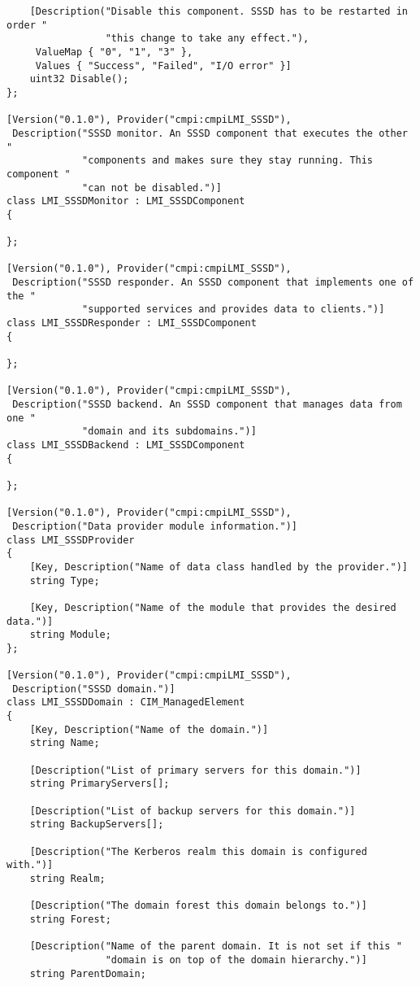 \begin{lstlisting}
    [Description("Disable this component. SSSD has to be restarted in order "
                 "this change to take any effect."),
     ValueMap { "0", "1", "3" },
     Values { "Success", "Failed", "I/O error" }]
    uint32 Disable();
};

[Version("0.1.0"), Provider("cmpi:cmpiLMI_SSSD"),
 Description("SSSD monitor. An SSSD component that executes the other "
             "components and makes sure they stay running. This component "
             "can not be disabled.")]
class LMI_SSSDMonitor : LMI_SSSDComponent
{

};

[Version("0.1.0"), Provider("cmpi:cmpiLMI_SSSD"),
 Description("SSSD responder. An SSSD component that implements one of the "
             "supported services and provides data to clients.")]
class LMI_SSSDResponder : LMI_SSSDComponent
{

};

[Version("0.1.0"), Provider("cmpi:cmpiLMI_SSSD"),
 Description("SSSD backend. An SSSD component that manages data from one "
             "domain and its subdomains.")]
class LMI_SSSDBackend : LMI_SSSDComponent
{

};

[Version("0.1.0"), Provider("cmpi:cmpiLMI_SSSD"),
 Description("Data provider module information.")]
class LMI_SSSDProvider
{
    [Key, Description("Name of data class handled by the provider.")]
    string Type;

    [Key, Description("Name of the module that provides the desired data.")]
    string Module;
};

[Version("0.1.0"), Provider("cmpi:cmpiLMI_SSSD"),
 Description("SSSD domain.")]
class LMI_SSSDDomain : CIM_ManagedElement
{
    [Key, Description("Name of the domain.")]
    string Name;

    [Description("List of primary servers for this domain.")]
    string PrimaryServers[];

    [Description("List of backup servers for this domain.")]
    string BackupServers[];

    [Description("The Kerberos realm this domain is configured with.")]
    string Realm;

    [Description("The domain forest this domain belongs to.")]
    string Forest;

    [Description("Name of the parent domain. It is not set if this "
                 "domain is on top of the domain hierarchy.")]
    string ParentDomain;


\end{lstlisting}
